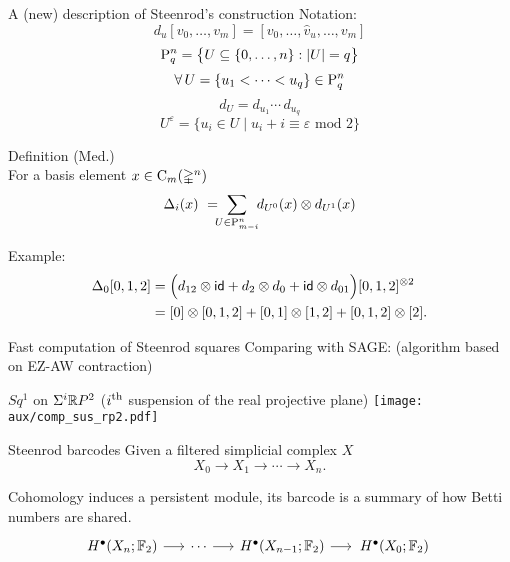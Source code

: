 \begin{frame}[fragile]{A (new) description of Steenrod's construction}
	\pause\vskip-5pt
	\textcolor{pblue}{Notation:}
	\vspace*{-5pt}
	\[
	d_u[v_0, \dots, v_m] = [v_0, \dots, \widehat v_u, \dots, v_m]
	\]
	\pause\vspace*{-15pt}
	\[
	\rP_q^n = \set[\big]{U \subseteq \{0, \dots, n\} : \bars{U} = q}
	\]
	\pause\vspace*{-15pt}
	\[
	\forall \, U = \{u_1 < \dots < u_q\} \in \rP_q^n
	\]
	\pause\vspace*{-15pt}
	\[
	d_U = d_{u_1} \dotsm \, d_{u_q}
	\]
	\pause\vspace*{-15pt}
	\[
	U^\varepsilon = \big\{ u_i \in U \mid u_i + i \equiv \varepsilon \text{ mod } 2 \big\}
	\]

	\bigskip\pause
	\textcolor{pblue}{Definition (Med.)} \\
	For a basis element $x \in \gchains_m(\gsimplex^n)$
	\vspace*{-5pt}
	\[
	\Delta_i(x) \ = \!\!\! \sum_{U \in \rP_{m-i}^n} \!\! d_{U^0}(x) \otimes d_{U^1}(x)
	\]
	\vspace*{-10pt}

	\pause
	\textcolor{pblue}{Example:}
	\vspace*{-5pt}
	\begin{align*}
	\Delta_0 [0,1,2] &=
	\Big( d_{12} \otimes \id + d_2 \otimes d_0 + \id \otimes d_{01} \Big) [0,1,2]^{\otimes 2} \\ &=
	[0] \otimes [0,1,2] + [0,1] \otimes [1,2] + [0,1,2] \otimes [2].
	\end{align*}
\end{frame}

\begin{frame}{Fast computation of Steenrod squares}
	\pause
	Comparing with SAGE: (algorithm based on EZ-AW contraction)

	\smallskip\pause
	\textcolor{pblue}{$Sq^1$} on \textcolor{pblue}{$\Sigma^i\R P^2$} ($i^\th$ suspension of the real projective plane)
	\medskip
	\texttt{[image: aux/comp\_sus\_rp2.pdf]}
\end{frame}

\begin{frame}[fragile]{Steenrod barcodes}
	\pause
	Given a filtered simplicial complex $X$
	\[
	X_0 \to X_1 \to \cdots \to X_n.
	\]

	\pause
	Cohomology induces a \textcolor{pblue}{persistent module}, its \textcolor{pblue}{barcode} is a summary of how Betti numbers are shared.
	\phantom{$Sq^k$ induces an endomorphism}
	\[
	\begin{tikzcd}[column sep = 15]
		H^\bullet(X_n; \Ftwo) \arrow[r] & \cdots \arrow[r] & H^\bullet(X_{n-1}; \Ftwo) \arrow[r] & \,H^\bullet(X_0; \Ftwo) \phantom{.}
	\end{tikzcd}
	\]
\end{frame}

